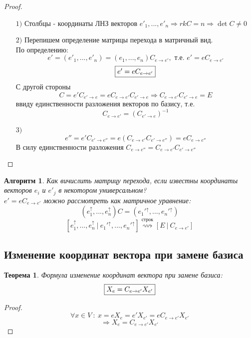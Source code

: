 \documentclass[a4paper, 12pt]{article}
\newcommand\tab[1][.5cm]{\hspace*{#1}}
\theoremstyle{definition}
\theoremstyle{plain}
\newtheorem*{theorem}{Теорема}
\newtheorem*{algorithm}{Алгоритм}
\theoremstyle{remark}
\begin{document}
  \begin{proof}\tab
    \begin{itemize}
      \item[$1)$] Столбцы - координаты ЛНЗ векторов $e'_1,...,e'_n \Longrightarrow rkC = n \Longrightarrow \det C \neq 0$
      \item[$2)$] Перепишем определение матрицы перехода в матричный вид. \\
      По определению: 
      $$e'=(e'_1,...,e'_n) = (e_1,...,e_n)C_{e \to e'}, \text{ т.е. } e' = eC_{e \to e'}$$
      \begin{equation}
        \fbox{$e' = eC_{e \to e'}$}
      \end{equation}
      С другой стороны 
      $$C = e'C_{e' \to e} = eC_{e \to e'}C_{e' \to e} \Longrightarrow C_{e \to e'}C_{e' \to e} = E$$ 
      ввиду единственности разложения векторов по базису, т.е. 
      $$C_{e \to e'} = (C_{e' \to e})^{-1}$$
      \item[$3)$] $$e'' = e'C_{e' \to e''} = e(C_{e \to e'}C_{e' \to e''}) = eC_{e \to e''}$$
      В силу единственности разложения $C_{e \to e''} = C_{e \to e'}C_{e' \to e''}$     
    \end{itemize}
  \end{proof} 
  \begin{algorithm}
    Как вичислить матрицу перехода, если известны координаты векторов $e_i$ и $e'_j$ в некотором универсальном?\\
    $e' = eC_{e \to e'}$ можно рассмотреть как матричное уравнение:
    $$(e_1^{\uparrow},...,e_n^{\uparrow})C = ({e_1'}^{\uparrow},...,{e_n'}^{\uparrow})$$
    $$[e_1^{\uparrow},...,e_n^{\uparrow} \ | \ {e_1'}^{\uparrow},...,{e_n'}^{\uparrow}] \overset{\text{строк}}{\rightsquigarrow} [E \ | \ C_{e \to e'}]$$   
  \end{algorithm}
  \subsection{Изменение координат вектора при замене базиса}
  \begin{theorem}
    Формула изменение координат вектора при замене базиса:
    \begin{equation}
      \fbox{$X_e = C_{e \to e'}X_{e'}$} 
    \end{equation}
  \end{theorem} 
  \begin{proof}
    $$\forall x \in V \ : \ x = eX_e = e'X_{e'} = eC_{e \to e'}X_{e'}$$
    $$\Longrightarrow  X_e = C_{e \to e'}X_{e'}$$ 
  \end{proof}
\end{document}

